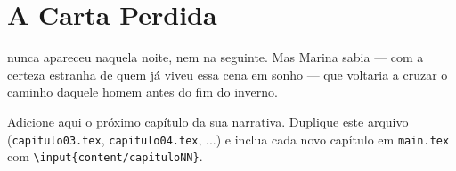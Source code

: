 \chapter{A Carta Perdida}

 nunca apareceu naquela noite, nem na seguinte.
Mas Marina sabia --- com a certeza estranha de quem já viveu essa cena em
sonho --- que voltaria a cruzar o caminho daquele homem antes do fim do
inverno.

\cenaseguinte

Adicione aqui o próximo capítulo da sua narrativa. Duplique este arquivo
(\texttt{capitulo03.tex}, \texttt{capitulo04.tex}, ...) e inclua cada novo
capítulo em \texttt{main.tex} com \texttt{\textbackslash input\{content/capituloNN\}}.
